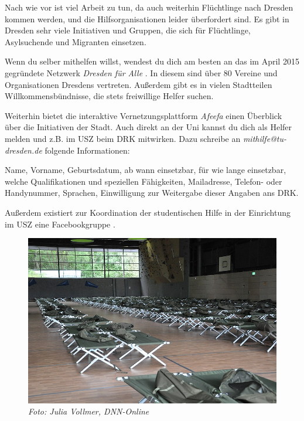 Nach wie vor ist viel Arbeit zu tun, da auch weiterhin Flüchtlinge nach Dresden kommen werden, und die Hilfsorganisationen leider überfordert sind. Es gibt in Dresden sehr viele Initiativen und Gruppen, die sich für Flüchtlinge, Asylsuchende und Migranten einsetzen. 

Wenn du selber mithelfen willst, wendest du dich am besten an das im April 2015 gegründete Netzwerk \textit{Dresden für Alle} . In diesem sind über 80 Vereine und Organisationen Dresdens vertreten. Außerdem gibt es in vielen Stadtteilen Willkommensbündnisse, die stets freiwillige Helfer suchen.

Weiterhin bietet die interaktive Vernetzungsplattform \textit{Afeefa}  einen Überblick über die Initiativen der Stadt. Auch direkt an der Uni kannst du dich als Helfer melden und z.B. im USZ beim DRK mitwirken. Dazu schreibe an \textit{mithilfe@tu-dresden.de} folgende Informationen:

Name, Vorname, Geburtsdatum, ab wann einsetzbar, für wie lange einsetzbar, welche Qualifikationen und speziellen Fähigkeiten, Mailadresse, Telefon- oder Handynummer, Sprachen, Einwilligung zur Weitergabe dieser Angaben ans DRK.

Außerdem existiert zur Koordination der studentischen Hilfe in der Einrichtung im USZ eine Facebookgruppe .

\begin{figure}[h!]
\centering
\includegraphics[width=.8\linewidth]{img/usz_feldbetten.jpg}
\caption*{\small \textit{Foto: Julia Vollmer, DNN-Online}}
\end{figure}